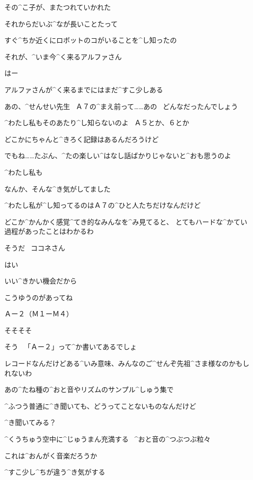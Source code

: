 \Sensei その^{こ}{子}が、またつれていかれた

\Sensei それからだいぶ^{なが}{長}いことたって

\Sensei すぐ^{ちか}{近}くにロボットのコがいることを^{し}{知}ったの

\Sensei それが、^{いま}{今}^{く}{来}るアルファさん

\Kokone はー

\page
\Kokone アルファさんが^{く}{来}るまでにはまだ^{すこ}{少}しある

\Kokone あの、^{せんせい}{先生}
\ Ａ７の^{まえ}{前}って……あの
\ どんなだったんでしょう

\Sensei ^{わたし}{私}もそのあたり^{し}{知}らないのよ
\ Ａ５とか、６とか

\Sensei どこかにちゃんと^{きろく}{記録}はあるんだろうけど

\Sensei でもね……たぶん、^{たの}{楽}しい^{はなし}{話}ばかりじゃないと^{おも}{思}うのよ

\Kokone ^{わたし}{私}も

\Kokone なんか、そんな^{き}{気}がしてました

\page
\Sensei ^{わたし}{私}が^{し}{知}ってるのはＡ７の^{ひと}{人}たちだけなんだけど

\Sensei どこか^{かんかく}{感覚}^{てき}{的}なみんなを^{み}{見}てると、
とてもハードな^{かてい}{過程}があったことはわかるわ

\Sensei そうだ
\ ココネさん

\Kokone はい

\Sensei いい^{きかい}{機会}だから

\page
\Sensei こうゆうのがあってね

\Sign Ａー２（Ｍ１ーＭ４）

\Kokone そそそそ

\Sensei そう
\ 「Ａー２」って^{か}{書}いてあるでしょ

\Sensei レコードなんだけどある^{いみ}{意味}、みんなのご^{せんぞ}{先祖}^{さま}{様}なのかもしれないわ

\page
\Sensei あの^{たね}{種}の^{おと}{音}やリズムのサンプル^{しゅう}{集}で

\Sensei ^{ふつう}{普通}に^{き}{聞}いても、どうってことないものなんだけど

\Sensei ^{き}{聞}いてみる？

\page[91]
\Kokone ^{くうちゅう}{空中}に^{じゅうまん}{充満}する
\ ^{おと}{音}の^{つぶつぶ}{粒々}

\Kokone これは^{おんがく}{音楽}だろうか

\Kokone ^{すこ}{少}し^{ちが}{違}う^{き}{気}がする

